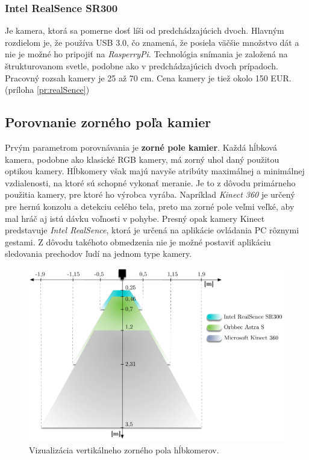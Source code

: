 \subsubsection{Intel RealSence SR300}
Je kamera, ktorá sa pomerne dosť líši od predchádzajúcich dvoch. Hlavným rozdielom je, že používa USB 3.0, čo znamená, že posiela väčšie množstvo dát a nie je možné ho pripojiť na \textit{RasperryPi}. Technológia snímania je založená na štrukturovanom svetle, podobne ako v predchádzajúcich dvoch prípadoch. Pracovný rozsah kamery je 25 až 70 cm. Cena kamery je tiež okolo 150 EUR. (príloha \ref{pr:realSence})

\subsection{Porovnanie zorného poľa kamier}
Prvým parametrom porovnávania je \textbf{zorné pole kamier}. Každá hĺbková kamera, podobne ako klasické RGB kamery, má zorný uhol daný použitou optikou kamery. Hĺbkomery však majú navyše atribúty maximálnej a minimálnej vzdialenosti, na ktoré sú schopné vykonať meranie. Je to z dôvodu primárneho použitia kamery, pre ktoré ho výrobca vyrába. Napríklad \textit{Kinect 360} je určený pre hernú konzolu a detekciu celého tela, preto ma zorné pole veľmi veľké, aby mal hráč aj istú dávku voľnosti v pohybe. Presný opak kamery Kinect predstavuje \textit{Intel RealSence}, ktorá je určená na aplikácie ovládania PC rôznymi gestami. Z dôvodu takéhoto obmedzenia nie je možné postaviť aplikáciu sledovania prechodov ľudí na jednom type kamery.


\begin{figure}[H]
\begin{center}
	\includegraphics[scale=0.60]{images/camerasViews}
	\caption{Vizualizácia vertikálneho zorného pola hĺbkomerov.}
	\end{center}
\end{figure}

